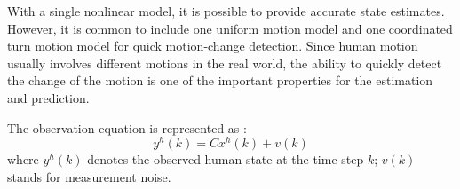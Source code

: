 \documentclass[letterpaper, 10 pt, conference]{ieeeconf}
\begin{document}
	With a single nonlinear model, it is possible to provide accurate state estimates. However, it is common to include one uniform motion model and one coordinated turn motion model for quick motion-change detection. 
	Since human motion usually involves different motions in the real world, the ability to quickly detect the change of the motion is one of the important properties for the estimation and prediction.          	
	
	
	
	
	
	
	The observation equation is represented as : 
	\begin{equation}
		y^h(k)=Cx^h(k)+v(k)\label{eqn:n_observation}
	\end{equation}
	where $y^h(k)$ denotes the observed human state at the time step $k$; $v(k)$ stands for measurement noise. 
	
\end{document}

